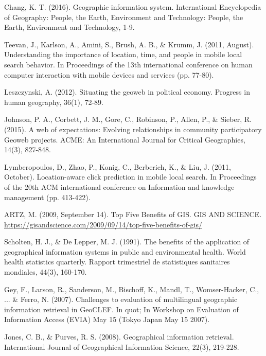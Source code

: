 \documentclass{irsarticle}
\begin{document}
\begin{thebibliography}{}

Chang, K. T. (2016). Geographic information system. International Encyclopedia
of Geography: People, the Earth, Environment and Technology: People, the Earth,
Environment and Technology, 1-9.

Teevan, J., Karlson, A., Amini, S., Brush, A. B., \& Krumm, J. (2011, August).
Understanding the importance of location, time, and people in mobile local
search behavior. In Proceedings of the 13th international conference on human
computer interaction with mobile devices and services (pp. 77-80).

Leszczynski, A. (2012). Situating the geoweb in political economy.
Progress in human geography, 36(1), 72-89.

Johnson, P. A., Corbett, J. M., Gore, C., Robinson, P., Allen, P., \& Sieber,
R. (2015). A web of expectations: Evolving relationships in community
participatory Geoweb projects. ACME: An International Journal for Critical
Geographies, 14(3), 827-848.

Lymberopoulos, D., Zhao, P., Konig, C., Berberich, K., \& Liu, J.
(2011, October). Location-aware click prediction in mobile local search. In
Proceedings of the 20th ACM international conference on Information and
knowledge management (pp. 413-422).

ARTZ, M. (2009, September 14). Top Five Benefits of GIS. GIS AND SCIENCE.
\url{https://gisandscience.com/2009/09/14/top-five-benefits-of-gis/}

Scholten, H. J., \& De Lepper, M. J. (1991). The benefits of the application of
geographical information systems in public and environmental health. World
health statistics quarterly. Rapport trimestriel de statistiques sanitaires
mondiales, 44(3), 160-170.

Gey, F., Larson, R., Sanderson, M., Bischoff, K., Mandl, T., Womser-Hacker, C.,
... \& Ferro, N. (2007). Challenges to evaluation of multilingual geographic
information retrieval in GeoCLEF. In quot; In Workshop on Evaluation of
Information Access (EVIA) May 15 (Tokyo Japan May 15 2007).

Jones, C. B., \& Purves, R. S. (2008). Geographical information retrieval.
International Journal of Geographical Information Science, 22(3), 219-228.


\end{thebibliography}
\end{document}
